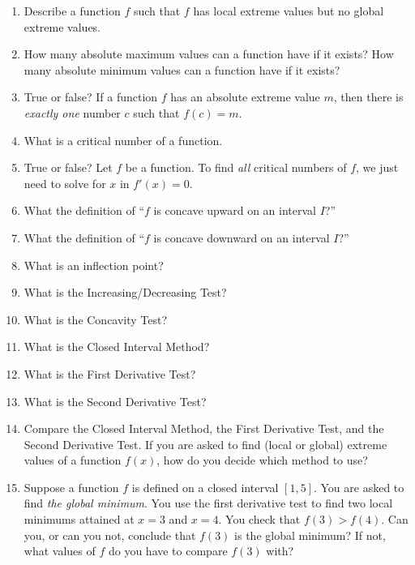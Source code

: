 \documentclass[../main.tex]{subfiles}
\begin{document}
\begin{enumerate}[label=\thesection.\arabic*, align=left]
  \item Describe a function \(f\) such that \(f\) has local extreme values but no global extreme values.

  \item How many absolute maximum values can a function have if it exists? How many absolute minimum values can a function have if it exists? 

  \item True or false? If a function \(f\) has an absolute extreme value \(m\), then there is \emph{exactly one} number \(c\) such that \(f(c) = m\). 

  \item What is a critical number of a function.

  \item True or false? Let \(f\) be a function. To find \emph{all} critical numbers of \(f\), we just need to solve for \(x\) in \(f'(x) = 0\). 

  \item What the definition of ``\(f\) is concave upward on an interval \(I\)?''

  \item What the definition of ``\(f\) is concave downward on an interval \(I\)?''

  \item What is an inflection point?

  \item What is the Increasing/Decreasing Test?

  \item What is the Concavity Test?

  \item What is the Closed Interval Method?

  \item What is the First Derivative Test?

  \item What is the Second Derivative Test?

  \item Compare the Closed Interval Method, the First Derivative Test, and the Second Derivative Test. If you are asked to find (local or global) extreme values of a function \(f(x)\), how do you decide which method to use?

  \item Suppose a function \(f\) is defined on a closed interval \([1,5]\). You are asked to find \emph{the global minimum}. You use the first derivative test to find two local minimums attained at \(x=3\) and \(x=4\). You check that \(f(3) > f(4)\). Can you, or can you not, conclude that \(f(3)\) is the global minimum? If not, what values of \(f\) do you have to compare \(f(3)\) with?


\end{enumerate}
\end{document}
